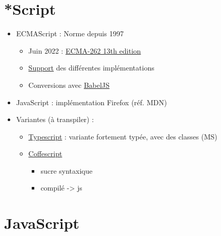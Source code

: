 \hypertarget{script}{%
\section{*Script}\label{script}}

\begin{itemize}
\tightlist
\item
  ECMAScript : Norme depuis 1997

  \begin{itemize}
  \tightlist
  \item
    Juin 2022 :
    \href{https://www.ecma-international.org/publications-and-standards/standards/ecma-262/}{ECMA-262
    13th edition}
  \item
    \href{http://kangax.github.io/compat-table/es2016plus/}{Support} des
    différentes implémentations
  \item
    Conversions avec \href{https://babeljs.io/}{BabelJS}
  \end{itemize}
\item
  JavaScript : implémentation Firefox (réf. MDN)
\item
  Variantes (à transpiler) :

  \begin{itemize}
  \tightlist
  \item
    \href{https://www.typescriptlang.org/}{Typescript} : variante
    fortement typée, avec des classes (MS)
  \item
    \href{http://coffeescript.org/}{Coffescript}

    \begin{itemize}
    \tightlist
    \item
      sucre syntaxique
    \item
      compilé -\textgreater{} js
    \end{itemize}
  \end{itemize}
\end{itemize}

\hypertarget{javascript}{%
\section{JavaScript}\label{javascript}}

